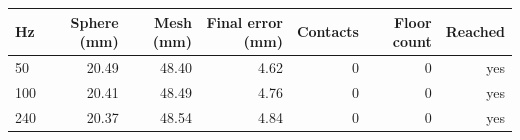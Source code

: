 \begin{tabular}{lrrrrrr}
\toprule
Hz & Sphere (mm) & Mesh (mm) & Final error (mm) & Contacts & Floor count & Reached \\
\midrule
50 & 20.49 & 48.40 & 4.62 & 0 & 0 & yes \\
100 & 20.41 & 48.49 & 4.76 & 0 & 0 & yes \\
240 & 20.37 & 48.54 & 4.84 & 0 & 0 & yes \\
\bottomrule
\end{tabular}
